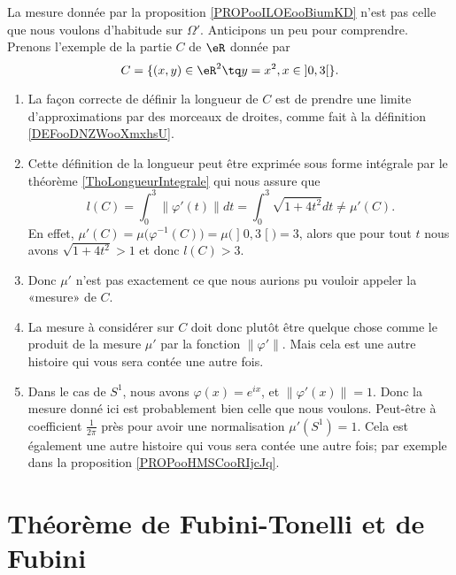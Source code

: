 \begin{remark}     \label{REMooOMYYooNFiKOs}
	La mesure donnée par la proposition \ref{PROPooILOEooBiumKD} n'est pas celle que nous voulons d'habitude sur \( \Omega'\). Anticipons un peu pour comprendre. Prenons l'exemple de la partie \( C\) de \( \eR\) donnée par
	\begin{equation}
		C=\{ (x,y)\in \eR^2\tq y=x^2,x\in \mathopen] 0 , 3 \mathclose[ \}.
	\end{equation}
	\begin{enumerate}
		\item
		      La façon correcte de définir la longueur de \( C\) est de prendre une limite d'approximations par des morceaux de droites, comme fait à la définition \ref{DEFooDNZWooXmxhsU}.
		\item
		      Cette définition de la longueur peut être exprimée sous forme intégrale par le théorème \ref{ThoLongueurIntegrale} qui nous assure que
		      \begin{equation}
			      l(C)=\int_0^3\| \varphi'(t) \|dt=\int_0^3\sqrt{ 1+4t^2 }dt\neq \mu'(C).
		      \end{equation}
		      En effet, \( \mu'(C)=\mu\big( \varphi^{-1}(C) \big)=\mu\big( \mathopen] 0 , 3 \mathclose[ \big)=3\), alors que pour tout \( t\) nous avons \( \sqrt{ 1+4t^2 }>1\) et donc \( l(C)>3\).
		\item
		      Donc \( \mu'\) n'est pas exactement ce que nous aurions pu vouloir appeler la «mesure» de \( C\).
		\item
		      La mesure à considérer sur \( C\) doit donc plutôt être quelque chose comme le produit de la mesure \( \mu'\) par la fonction \( \| \varphi' \|\). Mais cela est une autre histoire qui vous sera contée une autre fois.
		\item       \label{ITEMooJTKCooYQknqo}
		      Dans le cas de \( S^1\), nous avons \( \varphi(x)= e^{ix}\), et \( \| \varphi'(x) \|=1\). Donc la mesure donné ici est probablement bien celle que nous voulons. Peut-être à coefficient \( \frac{1}{ 2\pi }\) près pour avoir une normalisation \( \mu'(S^1)=1\). Cela est également une autre histoire qui vous sera contée une autre fois; par exemple dans la proposition \ref{PROPooHMSCooRIjcJq}.
	\end{enumerate}
\end{remark}

\section{Théorème de Fubini-Tonelli et de Fubini}

